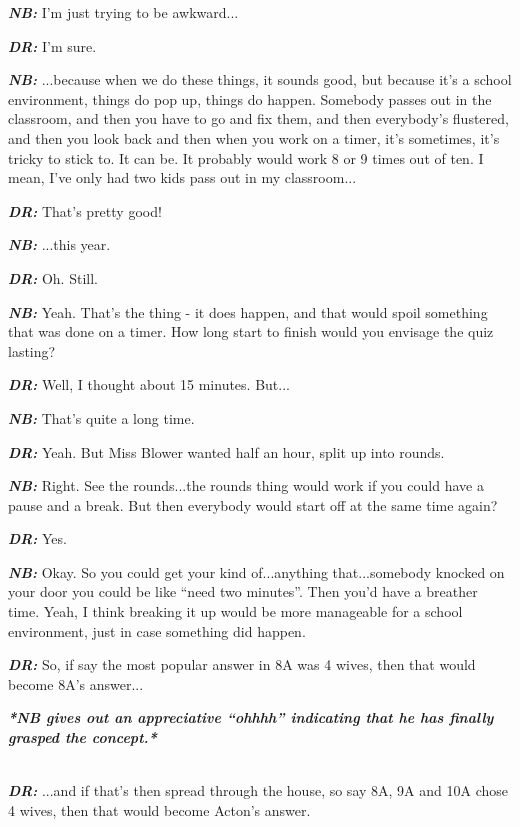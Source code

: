 \textit{\textbf{NB:}} I'm just trying to be awkward...

\textit{\textbf{DR:}} I'm sure.

\textit{\textbf{NB:}} ...because when we do these things, it sounds good, but because it's a school environment, things do pop up, things do happen. Somebody passes out in the classroom, and then you have to go and fix them, and then everybody's flustered, and then you look back and then when you work on a timer, it's sometimes, it's tricky to stick to. It can be. It probably would work 8 or 9 times out of ten. I mean, I've only had two kids pass out in my classroom...

\textit{\textbf{DR:}} That's pretty good!

\textit{\textbf{NB:}} ...this year.

\textit{\textbf{DR:}} Oh. Still.

\textit{\textbf{NB:}} Yeah. That's the thing - it does happen, and that would spoil something that was done on a timer. How long start to finish would you envisage the quiz lasting?

\textit{\textbf{DR:}} Well, I thought about 15 minutes. But...

\textit{\textbf{NB:}} That's quite a long time.

\textit{\textbf{DR:}} Yeah. But Miss Blower wanted half an hour, split up into rounds.

\textit{\textbf{NB:}} Right. See the rounds...the rounds thing would work if you could have a pause and a break. But then everybody would start off at the same time again?

\textit{\textbf{DR:}} Yes.

\textit{\textbf{NB:}} Okay. So you could get your kind of...anything that...somebody knocked on your door you could be like ``need two minutes''. Then you'd have a breather time. Yeah, I think breaking it up would be more manageable for a school environment, just in case something did happen.

\textit{\textbf{DR:}} So, if say the most popular answer in 8A was 4 wives, then that would become 8A's answer...\\

\begin{center}
\textit{\textbf{*NB gives out an appreciative ``ohhhh'' indicating that he has finally grasped the concept.*\\}}
\end{center}

\textit{\textbf{\\DR:}} ...and if that's then spread through the house, so say 8A, 9A and 10A chose 4 wives, then that would become Acton's answer.

